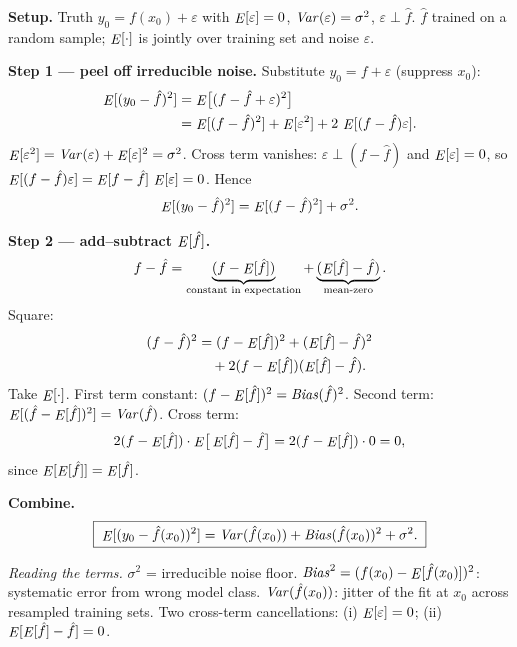 \textbf{Setup.} Truth $y_0=f(x_0)+\varepsilon$ with $\mathop{\mathit{E}}[\varepsilon]=0$, $\mathop{\mathit{Var}}(\varepsilon)=\sigma^2$, $\varepsilon\perp\hat f$. $\hat f$ trained on a random sample; $\mathop{\mathit{E}}[\cdot]$ is jointly over training set and noise $\varepsilon$.

\textbf{Step 1 — peel off irreducible noise.} Substitute $y_0=f+\varepsilon$ (suppress $x_0$):
\begin{align*}
\mathop{\mathit{E}}[(y_0-\hat f)^2]
&= \mathop{\mathit{E}}\!\big[(f-\hat f+\varepsilon)^2\big]\\
&= \mathop{\mathit{E}}[(f-\hat f)^2] + \mathop{\mathit{E}}[\varepsilon^2] + 2\,\mathop{\mathit{E}}[(f-\hat f)\varepsilon].
\end{align*}
$\mathop{\mathit{E}}[\varepsilon^2]=\mathop{\mathit{Var}}(\varepsilon)+\mathop{\mathit{E}}[\varepsilon]^2=\sigma^2$. Cross term vanishes: $\varepsilon\perp(f-\hat f)$ and $\mathop{\mathit{E}}[\varepsilon]=0$, so
$\mathop{\mathit{E}}[(f-\hat f)\varepsilon]=\mathop{\mathit{E}}[f-\hat f]\,\mathop{\mathit{E}}[\varepsilon]=0$. Hence
\begin{align*}
\mathop{\mathit{E}}[(y_0-\hat f)^2] = \mathop{\mathit{E}}[(f-\hat f)^2] + \sigma^2.
\end{align*}

\textbf{Step 2 — add--subtract $\mathop{\mathit{E}}[\hat f]$.}
\begin{align*}
f-\hat f = \underbrace{(f-\mathop{\mathit{E}}[\hat f])}_{\text{constant in expectation}} + \underbrace{(\mathop{\mathit{E}}[\hat f]-\hat f)}_{\text{mean-zero}}.
\end{align*}
Square:
\begin{align*}
(f-\hat f)^2
&= (f-\mathop{\mathit{E}}[\hat f])^2 + (\mathop{\mathit{E}}[\hat f]-\hat f)^2\\
&\quad{}+ 2(f-\mathop{\mathit{E}}[\hat f])(\mathop{\mathit{E}}[\hat f]-\hat f).
\end{align*}
Take $\mathop{\mathit{E}}[\cdot]$. First term constant: $(f-\mathop{\mathit{E}}[\hat f])^2 = \mathop{\mathit{Bias}}(\hat f)^2$. Second term: $\mathop{\mathit{E}}[(\hat f-\mathop{\mathit{E}}[\hat f])^2]=\mathop{\mathit{Var}}(\hat f)$. Cross term:
\begin{align*}
2(f-\mathop{\mathit{E}}[\hat f])\cdot\mathop{\mathit{E}}\!\big[\mathop{\mathit{E}}[\hat f]-\hat f\big] = 2(f-\mathop{\mathit{E}}[\hat f])\cdot 0 = 0,
\end{align*}
since $\mathop{\mathit{E}}[\mathop{\mathit{E}}[\hat f]]=\mathop{\mathit{E}}[\hat f]$.

\textbf{Combine.}
\begin{align*}
\boxed{\;\mathop{\mathit{E}}[(y_0-\hat f(x_0))^2] = \mathop{\mathit{Var}}(\hat f(x_0)) + \mathop{\mathit{Bias}}(\hat f(x_0))^2 + \sigma^2.\;}
\end{align*}

\smallskip
\emph{Reading the terms.} $\sigma^2$ = irreducible noise floor. $\mathop{\mathit{Bias}}^2=(f(x_0)-\mathop{\mathit{E}}[\hat f(x_0)])^2$: systematic error from wrong model class. $\mathop{\mathit{Var}}(\hat f(x_0))$: jitter of the fit at $x_0$ across resampled training sets. Two cross-term cancellations: (i) $\mathop{\mathit{E}}[\varepsilon]=0$; (ii) $\mathop{\mathit{E}}[\mathop{\mathit{E}}[\hat f]-\hat f]=0$.
